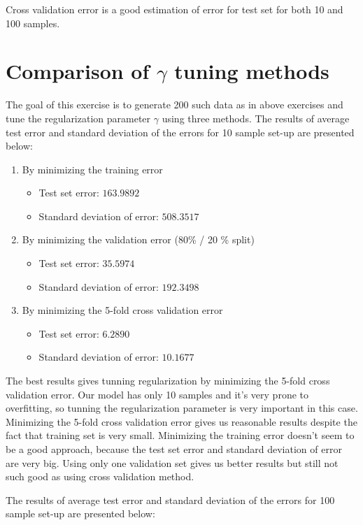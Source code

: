 \documentclass{article} %
\begin{document}
Cross validation error is a good estimation of error for test set for both 10 and 100 samples. 


\section{Comparison of  $\gamma$ tuning methods}
The goal of this exercise is to generate 200 such data as in above exercises and tune the regularization parameter $\gamma$ using three methods. The results of average test error and standard deviation of the errors for 10 sample set-up are presented below:

\begin{enumerate}
\item By minimizing the training error
\begin{itemize}
\item Test set error: $163.9892$
\item Standard deviation of error: $508.3517$
\end{itemize}
\item By minimizing the validation error (80\% / 20 \% split)
\begin{itemize}
\item Test set error: $35.5974$
\item Standard deviation of error: $192.3498$
\end{itemize}
\item By minimizing the 5-fold cross validation error
\begin{itemize}
\item Test set error: $6.2890$
\item Standard deviation of error: $10.1677$
\end{itemize}
\end{enumerate}

The best results gives tunning regularization by minimizing the 5-fold cross validation error. Our model has only 10 samples and it's very prone to overfitting, so tunning the regularization parameter is very important in this case. Minimizing the 5-fold cross validation error gives us reasonable results despite the fact that training set is very small. Minimizing the training error doesn't seem to be a good approach, because the test set error and  standard deviation of error are very big. Using only one validation set gives us better results but still not such good as using cross validation method.


The results of average test error and standard deviation of the errors for 100 sample set-up are presented below:
\end{document}
